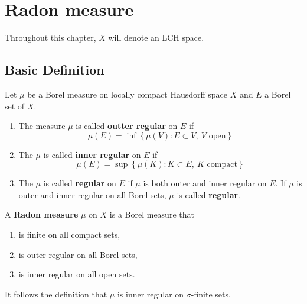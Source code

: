 \documentclass[12pt, a4paper, oneside]{book}
\begin{document}
\chapter{Radon measure} %
Throughout this chapter, $X$ will denote an LCH space.

\section{Basic Definition} %
\begin{definition}
    Let $\mu$ be a Borel measure on locally compact
    Hausdorff space $X$ and $E$ a Borel set of $X$.
    \begin{enumerate}
        \item
              The measure $\mu$ is called \textbf{outter regular} on $E$ if
              \begin{equation*}
                  \mu(E)=\inf\left\{\mu(V): E \subset V,\: V \text{ open}\right\}
              \end{equation*}
        \item
              The $\mu$ is called \textbf{inner regular} on $E$ if
              \begin{equation*}
                  \mu(E)=\sup\left\{\mu(K):K\subset E,\: K \text{ compact}\right\}
              \end{equation*}
        \item
              The $\mu$ is called \textbf{regular} on $E$ if $\mu$ is both outer and inner regular on $E$.
              If $\mu$ is outer and inner regular on all Borel sets, $\mu$ is called \textbf{regular}.
    \end{enumerate}
\end{definition}

\begin{definition}
    A \textbf{Radon measure} $\mu$ on $X$ is a Borel measure that
    \begin{enumerate}[label=(\roman*)]
        \item
              is finite on all compact sets,
        \item
              is outer regular on all Borel sets,
        \item
              is inner regular on all open sets.
    \end{enumerate}
    \begin{remark}
        It follows the definition that $\mu$ is inner regular on $\sigma$-finite sets.


    \end{remark}
\end{definition}
\end{document}
